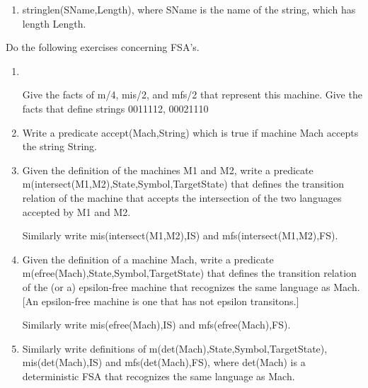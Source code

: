 \begin{enumerate}
\begin{enumerate}
\item
stringlen(SName,Length), where SName is the name of the string, which
has length Length.
\end{enumerate}

Do the following exercises concerning FSA's.
\begin{enumerate}
\item 
   \mbox{
      \epsfxsize 4.2in %
      \epsfysize 1.0in %
   }

Give the facts of m/4, mis/2, and mfs/2 that represent this machine.
Give the facts that define strings 0011112, 00021110
\item
Write a predicate accept(Mach,String) which is true if machine Mach
accepts the string String.

\item
Given the definition of the machines M1 and M2, write a predicate
m(intersect(M1,M2),State,Symbol,TargetState) that defines the
transition relation of the machine that accepts the intersection of
the two languages accepted by M1 and M2.

Similarly write mis(intersect(M1,M2),IS) and mfs(intersect(M1,M2),FS).

\item
Given the definition of a machine Mach, write a predicate
m(efree(Mach),State,Symbol,TargetState) that defines the transition
relation of the (or a) epsilon-free machine that recognizes the same
language as Mach.  [An epsilon-free machine is one that has not
epsilon transitons.]  

Similarly write mis(efree(Mach),IS) and mfs(efree(Mach),FS).

\item
Similarly write definitions of m(det(Mach),State,Symbol,TargetState),
mis(det(Mach),IS) and mfs(det(Mach),FS), where det(Mach) is a
deterministic FSA that recognizes the same language as Mach.


\end{enumerate}

\end{enumerate}

